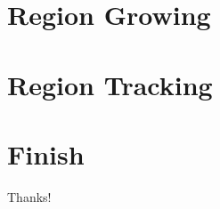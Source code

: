 \documentclass[11pt]{beamer}
\begin{document}

\section[Region Growing]{Region Growing}

\section[Region Tracking]{Region Tracking}

\section[Finish]{Finish}

\begin{frame}
	\Large{Thanks!}
\end{frame}
\end{document}
